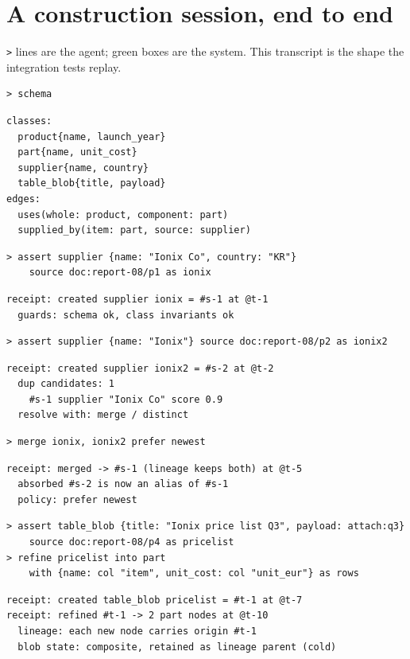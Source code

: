 \documentclass[11pt]{article}
\begin{document}
\section{A construction session, end to end}

\texttt{>} lines are the agent; green boxes are the system. This transcript is the shape the integration tests replay.

\begin{lstlisting}[style=gl]
> schema
\end{lstlisting}
\begin{lstlisting}[style=res]
classes:
  product{name, launch_year}
  part{name, unit_cost}
  supplier{name, country}
  table_blob{title, payload}
edges:
  uses(whole: product, component: part)
  supplied_by(item: part, source: supplier)
\end{lstlisting}

\begin{lstlisting}[style=gl]
> assert supplier {name: "Ionix Co", country: "KR"}
    source doc:report-08/p1 as ionix
\end{lstlisting}
\begin{lstlisting}[style=res]
receipt: created supplier ionix = #s-1 at @t-1
  guards: schema ok, class invariants ok
\end{lstlisting}

\begin{lstlisting}[style=gl]
> assert supplier {name: "Ionix"} source doc:report-08/p2 as ionix2
\end{lstlisting}
\begin{lstlisting}[style=res]
receipt: created supplier ionix2 = #s-2 at @t-2
  dup candidates: 1
    #s-1 supplier "Ionix Co" score 0.9
  resolve with: merge / distinct
\end{lstlisting}

\begin{lstlisting}[style=gl]
> merge ionix, ionix2 prefer newest
\end{lstlisting}
\begin{lstlisting}[style=res]
receipt: merged -> #s-1 (lineage keeps both) at @t-5
  absorbed #s-2 is now an alias of #s-1
  policy: prefer newest
\end{lstlisting}

\begin{lstlisting}[style=gl]
> assert table_blob {title: "Ionix price list Q3", payload: attach:q3}
    source doc:report-08/p4 as pricelist
> refine pricelist into part
    with {name: col "item", unit_cost: col "unit_eur"} as rows
\end{lstlisting}
\begin{lstlisting}[style=res]
receipt: created table_blob pricelist = #t-1 at @t-7
receipt: refined #t-1 -> 2 part nodes at @t-10
  lineage: each new node carries origin #t-1
  blob state: composite, retained as lineage parent (cold)
\end{lstlisting}
\end{document}
